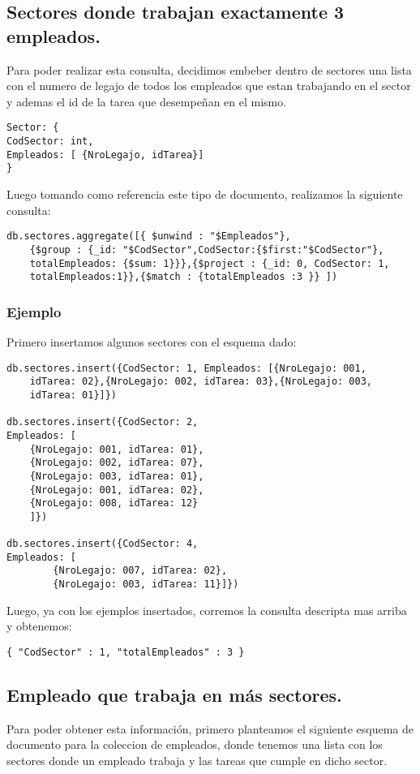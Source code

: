 \subsection{Sectores donde trabajan exactamente 3 empleados.}
Para poder realizar esta consulta, decidimos embeber dentro de sectores una lista con
el numero de legajo de todos los empleados que estan trabajando en el sector y ademas el id de la tarea que
desempeñan en el mismo.

\begin{lstlisting}
Sector: {
CodSector: int,
Empleados: [ {NroLegajo, idTarea}]
}
\end{lstlisting}


Luego tomando como referencia este tipo de documento, realizamos la siguiente consulta:
\begin{lstlisting}
db.sectores.aggregate([{ $unwind : "$Empleados"},
	{$group : {_id: "$CodSector",CodSector:{$first:"$CodSector"},
	totalEmpleados: {$sum: 1}}},{$project : {_id: 0, CodSector: 1,
	totalEmpleados:1}},{$match : {totalEmpleados :3 }} ])
\end{lstlisting}

\subsubsection{Ejemplo}
Primero insertamos algunos sectores con el esquema dado:
\begin{lstlisting}
db.sectores.insert({CodSector: 1, Empleados: [{NroLegajo: 001,
	idTarea: 02},{NroLegajo: 002, idTarea: 03},{NroLegajo: 003,
	idTarea: 01}]})

db.sectores.insert({CodSector: 2,
Empleados: [
	{NroLegajo: 001, idTarea: 01},
	{NroLegajo: 002, idTarea: 07},
	{NroLegajo: 003, idTarea: 01},
	{NroLegajo: 001, idTarea: 02},
	{NroLegajo: 008, idTarea: 12}
	]})

db.sectores.insert({CodSector: 4,
Empleados: [
		{NroLegajo: 007, idTarea: 02},
		{NroLegajo: 003, idTarea: 11}]})
\end{lstlisting}

Luego, ya con los ejemplos insertados, corremos la consulta descripta mas arriba y obtenemos:
\begin{lstlisting}
{ "CodSector" : 1, "totalEmpleados" : 3 }
\end{lstlisting}

\subsection{Empleado que trabaja en más sectores.}
Para poder obtener esta información, primero planteamos el siguiente esquema de documento para la coleccion de empleados, donde tenemos una lista con los sectores donde un empleado trabaja y las tareas que cumple en dicho sector.

